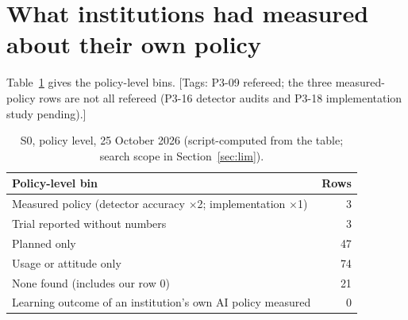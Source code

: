 \documentclass[11pt]{article}
\newcommand{\proof}[1]{{\color{red}\textsf{[#1]}}}
\begin{document}
\section{What institutions had measured about their own policy}
Table~\ref{tab:tally} gives the policy-level bins. \proof{Tags: P3-09 refereed; the three measured-policy rows are not all refereed (P3-16 detector audits and P3-18 implementation study pending).}
\begin{table}[h]\centering\small
\begin{tabular}{lr}\toprule
Policy-level bin & Rows\\\midrule
Measured policy (detector accuracy $\times$2; implementation $\times$1) & 3\\
Trial reported without numbers & 3\\
Planned only & 47\\
Usage or attitude only & 74\\
None found (includes our row 0) & 21\\\midrule
Learning outcome of an institution's own AI policy measured & 0\\\bottomrule
\end{tabular}
\caption{S0, policy level, 25 October 2026 (script-computed from the table; search scope in Section~\ref{sec:lim}).}\label{tab:tally}
\end{table}
\end{document}
